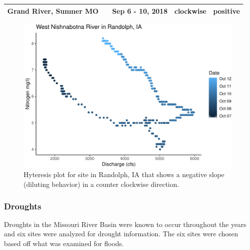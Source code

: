 \documentclass[12pt,]{article}
\begin{document}
\begin{longtable}[]{@{}lclll@{}}
\begin{minipage}[t]{0.15\columnwidth}
Grand River, Sumner MO\strut
\end{minipage} & \begin{minipage}[t]{0.22\columnwidth}\centering
06902000\strut
\end{minipage} & \begin{minipage}[t]{0.20\columnwidth}\raggedright
Sep 6 - 10, 2018\strut
\end{minipage} & \begin{minipage}[t]{0.17\columnwidth}\raggedright
clockwise\strut
\end{minipage} & \begin{minipage}[t]{0.12\columnwidth}\raggedright
positive\strut
\end{minipage}\tabularnewline
\bottomrule
\end{longtable}

\begin{figure}
\centering
\includegraphics{Missouri-Reasearch-Project---FINAL_files/figure-latex/Randolphstorm-1.pdf}
\caption{Hyteresis plot for site in Randolph, IA that shows a negative
slope (diluting behavior) in a counter clockwise direction.}
\end{figure}

\hypertarget{droughts}{%
\subsubsection{Droughts}\label{droughts}}

Droughts in the Missouri River Basin were known to occur throughout the
years and six sites were analyzed for drought information. The six sites
were chosen based off what was examined for floods.
\end{document}
